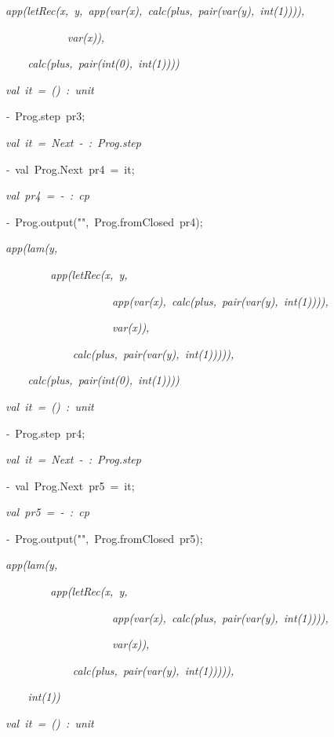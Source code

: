 \begin{list}{}
\item[]\textsl{app(letRec(x,\ y,\ app(var(x),\ calc(plus,\ pair(var(y),\ int(1)))),}
\item[]\textsl{\ \ \ \ \ \ \ \ \ \ \ var(x)),}
\item[]\textsl{\ \ \ \ calc(plus,\ pair(int(0),\ int(1))))}
\item[]\textsl{val\ it\ =\ ()\ :\ unit}
\item[]\textsl{-\ }Prog.step\ pr3;
\item[]\textsl{val\ it\ =\ Next\ -\ :\ Prog.step}
\item[]\textsl{-\ }val\ Prog.Next\ pr4\ =\ it;
\item[]\textsl{val\ pr4\ =\ -\ :\ cp}
\item[]\textsl{-\ }Prog.output("",\ Prog.fromClosed\ pr4);
\item[]\textsl{app(lam(y,}
\item[]\textsl{\ \ \ \ \ \ \ \ app(letRec(x,\ y,}
\item[]\textsl{\ \ \ \ \ \ \ \ \ \ \ \ \ \ \ \ \ \ \ app(var(x),\ calc(plus,\ pair(var(y),\ int(1)))),}
\item[]\textsl{\ \ \ \ \ \ \ \ \ \ \ \ \ \ \ \ \ \ \ var(x)),}
\item[]\textsl{\ \ \ \ \ \ \ \ \ \ \ \ calc(plus,\ pair(var(y),\ int(1))))),}
\item[]\textsl{\ \ \ \ calc(plus,\ pair(int(0),\ int(1))))}
\item[]\textsl{val\ it\ =\ ()\ :\ unit}
\item[]\textsl{-\ }Prog.step\ pr4;
\item[]\textsl{val\ it\ =\ Next\ -\ :\ Prog.step}
\item[]\textsl{-\ }val\ Prog.Next\ pr5\ =\ it;
\item[]\textsl{val\ pr5\ =\ -\ :\ cp}
\item[]\textsl{-\ }Prog.output("",\ Prog.fromClosed\ pr5);
\item[]\textsl{app(lam(y,}
\item[]\textsl{\ \ \ \ \ \ \ \ app(letRec(x,\ y,}
\item[]\textsl{\ \ \ \ \ \ \ \ \ \ \ \ \ \ \ \ \ \ \ app(var(x),\ calc(plus,\ pair(var(y),\ int(1)))),}
\item[]\textsl{\ \ \ \ \ \ \ \ \ \ \ \ \ \ \ \ \ \ \ var(x)),}
\item[]\textsl{\ \ \ \ \ \ \ \ \ \ \ \ calc(plus,\ pair(var(y),\ int(1))))),}
\item[]\textsl{\ \ \ \ int(1))}
\item[]\textsl{val\ it\ =\ ()\ :\ unit}
\end{list}
